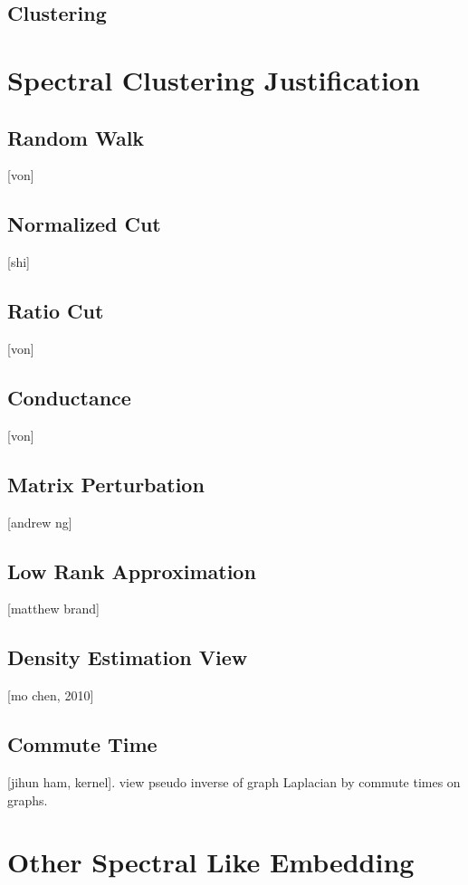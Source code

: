 \subsection{Clustering}


\section{Spectral Clustering Justification}
\label{sec:justification}

\subsection{Random Walk}
[von]

\subsection{Normalized Cut}
[shi]

\subsection{Ratio Cut}
[von]

\subsection{Conductance}
[von]

\subsection{Matrix Perturbation}
[andrew ng]

\subsection{Low Rank Approximation}
[matthew brand]

\subsection{Density Estimation View}
[mo chen, 2010]

\subsection{Commute Time}
[jihun ham, kernel]. 
view pseudo inverse of graph Laplacian by commute times on graphs. 

\section{Other Spectral Like Embedding}
\label{sec:nldr}

